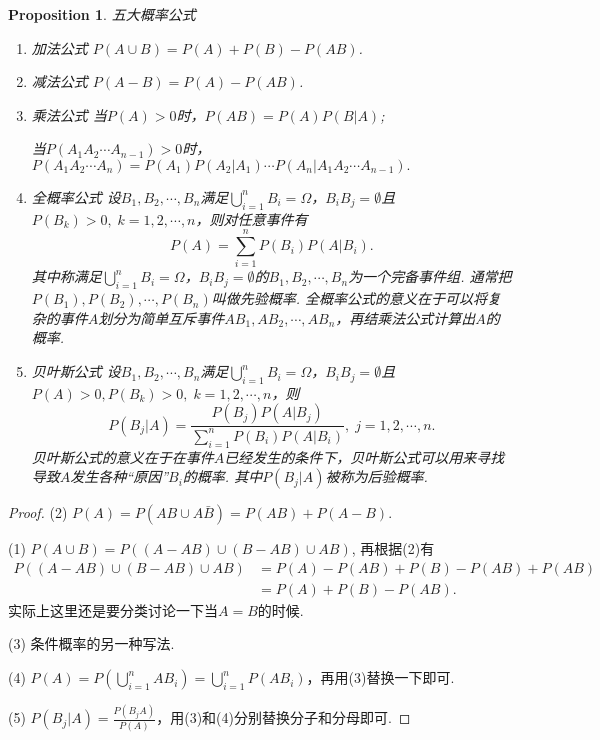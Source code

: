 \documentclass{article}
\newtheorem{proposition}[theorem]{Proposition}
\begin{document}
\begin{proposition}
\rm 五大概率公式
\begin{enumerate}
	\item {\color{red}加法公式} $P(A \cup B) = P(A) + P(B) - P(AB)$.
	\item {\color{red}减法公式} $P(A - B) = P(A) - P(AB)$.
	\item {\color{red}乘法公式} 当$P(A) > 0$时，$P(AB) = P(A)P(B|A)$;
	
	当$P(A_1A_2\cdots A_{n-1}) > 0$时，$P(A_1A_2\cdots A_n) = P(A_1)P(A_2|A_1)\cdots P(A_n|A_1A_2\cdots A_{n-1}).$
	\item {\color{red}全概率公式} 设$B_1,B_2,\cdots,B_n$满足$\bigcup\limits_{i=1}^n B_i = \Omega$，$B_iB_j = \emptyset$且$P(B_k) > 0,\; k=1,2,\cdots,n$，则对任意事件有
	$$
		P(A) = \sum\limits_{i=1}^n P(B_i)P(A|B_i).
	$$
	其中称满足$\bigcup\limits_{i=1}^n B_i = \Omega$，$B_iB_j = \emptyset$的$B_1,B_2,\cdots,B_n$为一个{\color{red}完备事件组}. 通常把$P(B_1), P(B_2),\cdots,P(B_n)$叫做{\color{red}先验概率}. {\color{blue}全概率公式的意义在于可以将复杂的事件$A$划分为简单互斥事件$AB_1,AB_2,\cdots,AB_n$，再结乘法公式计算出$A$的概率}.
	\item {\color{red}贝叶斯公式} 设$B_1,B_2,\cdots,B_n$满足$\bigcup\limits_{i=1}^n B_i = \Omega$，$B_iB_j = \emptyset$且$P(A)>0, P(B_k) > 0,\; k=1,2,\cdots,n$，则
	$$
		P(B_j | A) = \frac{P(B_j)P(A|B_j)}{\sum\limits_{i=1}^n P(B_i)P(A|B_i)},\; j = 1,2,\cdots,n.
	$$
	贝叶斯公式的意义在于{\color{blue}在事件$A$已经发生的条件下，贝叶斯公式可以用来寻找导致$A$发生各种“原因”$B_i$的概率}. 其中$P(B_j|A)$被称为{\color{red}后验概率}.
\end{enumerate}
\end{proposition}

\begin{proof}
(2) $P(A) = P(AB \cup A\bar{B}) = P(AB)+P(A-B).$

(1) $P(A \cup B) = P((A-AB) \cup (B-AB) \cup AB)$, 再根据(2)有
$$
\begin{array}{ll}
P((A-AB) \cup (B-AB) \cup AB) &= P(A)-P(AB) + P(B) - P(AB) + P(AB) \\
&= P(A) + P(B) -P(AB).
\end{array}
$$
{\color{blue} 实际上这里还是要分类讨论一下当$A=B$的时候.}

(3) 条件概率的另一种写法.

(4) $P(A) = P(\bigcup\limits_{i=1}^n AB_i) = \bigcup\limits_{i=1}^n P(AB_i)$，再用(3)替换一下即可.

(5) $P(B_j | A) =  \frac{P(B_jA)}{P(A)}$，用(3)和(4)分别替换分子和分母即可.

\end{proof}
\end{document}
